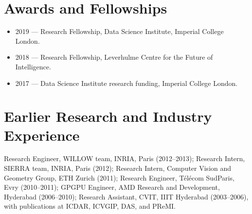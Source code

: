 \documentclass[a4paper,11pt]{article}
\newcommand{\plainListStart}{\begin{itemize}[leftmargin=0.25in, topsep=2pt, itemsep=1pt]}
\newcommand{\plainListEnd}{\end{itemize}}
\begin{document}
\section{Awards and Fellowships}
\plainListStart
  \item\small 2019 --- Research Fellowship, Data Science Institute, Imperial College London.
  \item\small 2018 --- Research Fellowship, Leverhulme Centre for the Future of Intelligence.
  \item\small 2017 --- Data Science Institute research funding, Imperial College London.
\plainListEnd

\section{Earlier Research and Industry Experience}
\small
Research Engineer, WILLOW team, INRIA, Paris (2012--2013); Research Intern, SIERRA team, INRIA, Paris (2012); Research Intern, Computer Vision and Geometry Group, ETH Zurich (2011); Research Engineer, T\'el\'ecom SudParis, Evry (2010--2011); GPGPU Engineer, AMD Research and Development, Hyderabad (2006--2010); Research Assistant, CVIT, IIIT Hyderabad (2003--2006), with publications at ICDAR, ICVGIP, DAS, and PReMI.
\normalsize
\end{document}
